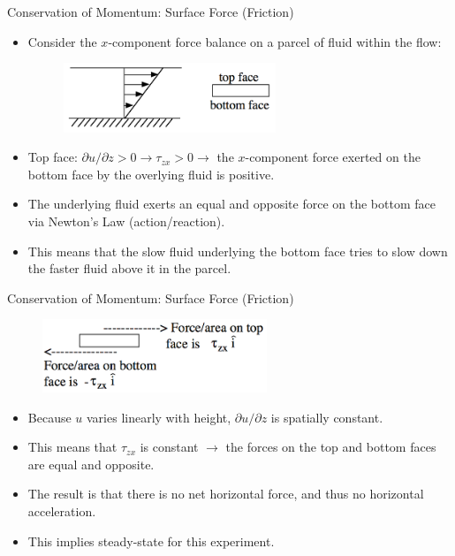 \begin{frame}{Conservation of Momentum: Surface Force (Friction)}
\begin{itemize}
	\item Consider the $x$-component force balance on a parcel of fluid within the flow:
	\begin{figure}
		\includegraphics[width=0.6\textwidth]{friction4.png}
	\end{figure}
	\item Top face: $\partial u / \partial z > 0 \rightarrow \tau_{zx} > 0 \rightarrow$ the $x$-component force exerted on the bottom face by the overlying fluid is positive.
	\item The underlying fluid exerts an equal and opposite force on the bottom face via Newton's  Law (action/reaction).
	\item This means that the slow fluid underlying the bottom face tries to slow down the faster fluid above it in the parcel.
\end{itemize}
\end{frame}
\begin{frame}{Conservation of Momentum: Surface Force (Friction)}
\begin{figure}
		\includegraphics[width=0.6\textwidth]{friction5.png}
	\end{figure}
\begin{itemize}
	\item Because $u$ varies linearly with height, $\partial u / \partial z$ is spatially constant.
	\item This means that $\tau_{zx}$ is constant $\rightarrow$ the forces on the top and bottom faces are equal and opposite.
	\item The result is that there is no net horizontal force, and thus no horizontal acceleration.
	\item This implies steady-state for this experiment.
\end{itemize}
\end{frame}
